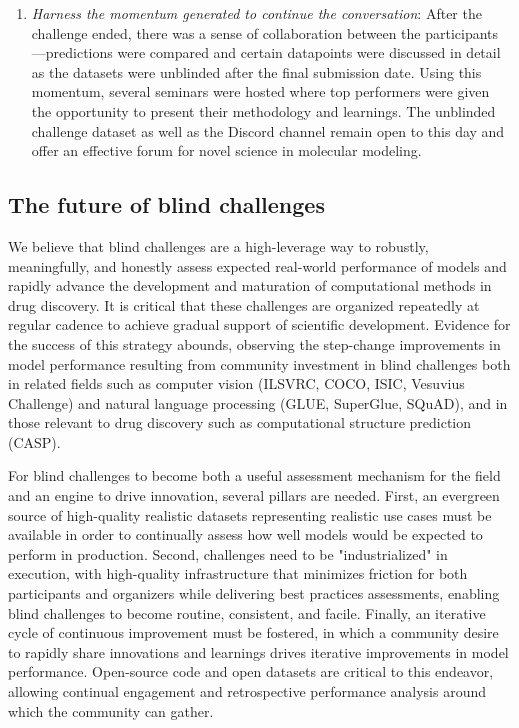 \documentclass[journal=jcim,manuscript=article]{achemso}
\begin{document}
\begin{enumerate}
    \item \textit{Harness the momentum generated to continue the conversation}: After the challenge ended, there was a sense of collaboration between the participants---predictions were compared and certain datapoints were discussed in detail as the datasets were unblinded after the final submission date. Using this momentum, several seminars were hosted where top performers were given the opportunity to present their methodology and learnings. The unblinded challenge dataset as well as the Discord channel remain open to this day and offer an effective forum for novel science in molecular modeling. 
    
\end{enumerate}


\subsection{The future of blind challenges}

We believe that blind challenges are a high-leverage way to robustly, meaningfully, and honestly assess expected real-world performance of models and rapidly advance the development and maturation of computational methods in drug discovery. It is critical that these challenges are organized repeatedly at regular cadence to achieve gradual support of scientific development.
Evidence for the success of this strategy abounds, observing the step-change improvements in model performance resulting from community investment in blind challenges both in related fields such as computer vision (ILSVRC\cite{ILSVRC15}, COCO\cite{coco}, ISIC\cite{tschandl_humancomputer_2020}, Vesuvius Challenge\cite{vesuvius}) and natural language processing (GLUE\cite{wang2019gluemultitaskbenchmarkanalysis}, SuperGlue\cite{sarlin2020supergluelearningfeaturematching},  SQuAD\cite{rajpurkar2016squad100000questionsmachine}), and in those relevant to drug discovery such as computational structure prediction (CASP)\cite{casp13_2019, casp14_2021, casp15_2023}. 

For blind challenges to become both a useful assessment mechanism for the field and an engine to drive innovation, several pillars are needed. 
First, an evergreen source of high-quality realistic datasets representing realistic use cases must be available in order to continually assess how well models would be expected to perform in production. 
Second, challenges need to be "industrialized" in execution, with high-quality infrastructure that minimizes friction for both participants and organizers while delivering best practices assessments, enabling blind challenges to become routine, consistent, and facile. 
Finally, an iterative cycle of continuous improvement must be fostered, in which a community desire to rapidly share innovations and learnings drives iterative improvements in model performance. 
Open-source code and open datasets are critical to this endeavor, allowing continual engagement and retrospective performance analysis around which the community can gather. 
\end{document}
